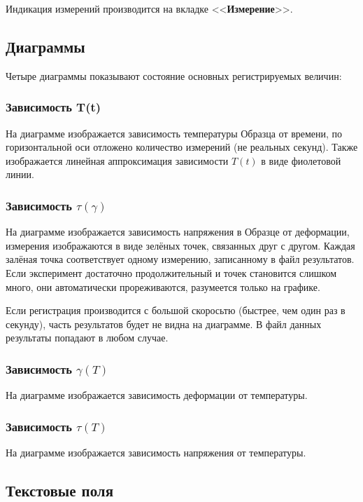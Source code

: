 \documentclass[12pt, a4paper, twocolumn]{book}
\newcommand{\CTL}[1]{<<{\bf #1}>>}
\begin{document}
Индикация измерений производится на вкладке \CTL{Измерение}.

\subsection{Диаграммы}

Четыре диаграммы показывают состояние основных регистрируемых величин:

\subsubsection{Зависимость T(t)}

На диаграмме изображается зависимость температуры Образца от времени, по горизонтальной оси отложено количество измерений (не реальных секунд). Также изображается линейная аппроксимация зависимости $T(t)$ в виде фиолетовой линии.

\subsubsection{Зависимость $\tau(\gamma)$}

На диаграмме изображается зависимость напряжения в Образце от деформации, измерения изображаются в виде зелёных точек, связанных друг с другом. Каждая залёная точка соответствует одному измерению, записанному в файл результатов. Если эксперимент достаточно продолжительный и точек становится слишком много, они автоматически прореживаются, разумеется только на графике.

Если регистрация производится с большой скоросьтю (быстрее, чем один раз в секунду), часть результатов будет не видна на диаграмме. В файл данных результаты попадают в любом случае.

\subsubsection{Зависимость $\gamma(T)$}

На диаграмме изображается зависимость деформации от температуры.

\subsubsection{Зависимость $\tau(T)$}

На диаграмме изображается зависимость напряжения от температуры.

\subsection{Текстовые поля}
\end{document}
